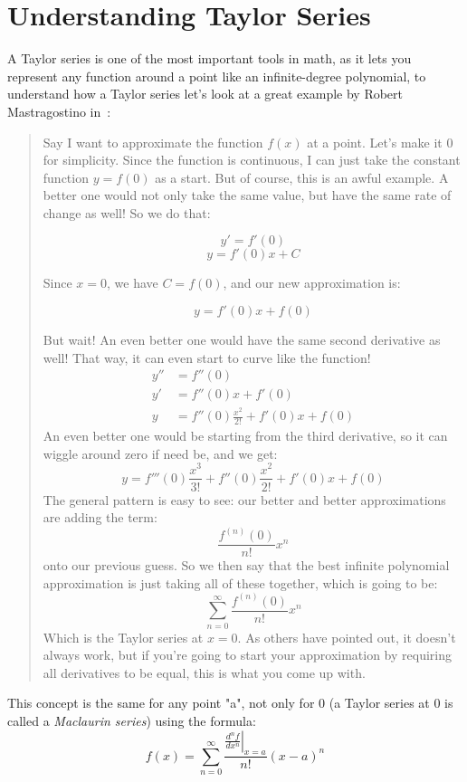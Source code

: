 \documentclass[12pt,a4paper]{article}
\begin{document}
\section{Understanding Taylor Series}\label{app:AppendixB}
A Taylor series is one of the most important tools in math, as it lets you represent any function around a point like an infinite-degree polynomial, to understand how a Taylor series let's look at a great example by Robert Mastragostino in~\cite{182868}:\\

\begin{quote}
Say I want to approximate the function \( f(x) \) at a point. Let's make it 0 for simplicity. Since the function is continuous, I can just take the constant function \( y = f(0) \) as a start. But of course, this is an awful example. A better one would not only take the same value, but have the same rate of change as well! So we do that:

\[
y' = f'(0)
\]
\[
y = f'(0)x + C
\]

Since \( x = 0 \), we have \( C = f(0) \), and our new approximation is:

\[
y = f'(0)x + f(0)
\]

But wait! An even better one would have the same second derivative as well! That way, it can even start to curve like the function! 
\begin{align*}
y'' &= f''(0) \\
y' &= f''(0)x + f'(0) \\ 
y &= f''(0)\frac{x^2}{2!} + f'(0)x + f(0)
\end{align*}
An even better one would be starting from the third derivative, so it can wiggle around zero if need be, and we get:
\[
y = f'''(0)\frac{x^3}{3!} + f''(0)\frac{x^2}{2!} + f'(0)x + f(0)
\]
The general pattern is easy to see: our better and better approximations are adding the term:
\[
\frac{f^{(n)}(0)}{n!}x^n
\]
onto our previous guess. So we then say that the best infinite polynomial approximation is just taking all of these together, which is going to be:
\[
\sum_{n=0}^{\infty} \frac{f^{(n)}(0)}{n!} x^n
\]
Which is the Taylor series at \( x = 0 \). As others have pointed out, it doesn't always work, but if you're going to start your approximation by requiring all derivatives to be equal, this is what you come up with.
\end{quote}

This concept is the same for any point "a", not only for 0 (a Taylor series at 0 is called a \textit{Maclaurin series}) using the formula:
\[
f(x) = \sum_{n = 0}^\infty \frac{\left.\frac{d^{n}f}{dx^n}\right|_{x=a}}{n!}(x - a)^n
\]
\end{document}
